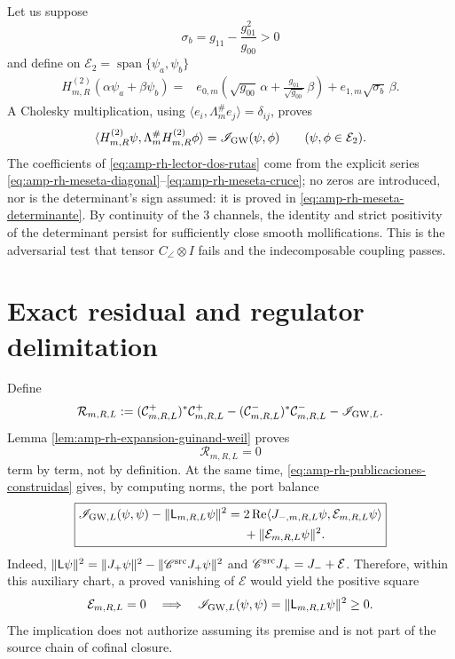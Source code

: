 Let us suppose
\[
 \sigma_b=g_{11}-\frac{g_{01}^2}{g_{00}}>0
\]
and define on \(\mathcal E_2=\operatorname{span}\{\psi_a,\psi_b\}\)
\begin{align}
 H^{(2)}_{m,R}(\alpha\psi_a+\beta\psi_b)
 ={}&
 e_{0,m}\left(
 \sqrt{g_{00}}\,\alpha
 +\frac{g_{01}}{\sqrt{g_{00}}}\,\beta\right)
 +e_{1,m}\sqrt{\sigma_b}\,\beta .
 \label{eq:amp-rh-lector-dos-rutas}
\end{align}
A Cholesky multiplication, using \(\langle e_i,\Lambda_m^\#e_j\rangle=\delta_{ij}\), proves
\begin{equation}\label{eq:amp-rh-meseta-energia-exacta}
 \langle H^{(2)}_{m,R}\psi,
         \Lambda_m^\#H^{(2)}_{m,R}\phi\rangle
 =\mathscr I_{\rm GW}(\psi,\phi)
 \qquad(\psi,\phi\in\mathcal E_2).
\end{equation}
The coefficients of \eqref{eq:amp-rh-lector-dos-rutas} come from the explicit series \eqref{eq:amp-rh-meseta-diagonal}--\eqref{eq:amp-rh-meseta-cruce}; no zeros are introduced, nor is the determinant's sign assumed: it is proved in \eqref{eq:amp-rh-meseta-determinante}. By continuity of the \(3\) channels, the identity and strict positivity of the determinant persist for sufficiently close smooth mollifications. This is the adversarial test that tensor \(C_\angle\otimes I\) fails and the indecomposable coupling passes.

\section*{Exact residual and regulator delimitation}

Define
\begin{equation}\label{eq:amp-rh-residual-finito}
 \mathcal R_{m,R,L}
 :=
 (\mathcal C^+_{m,R,L})^*\mathcal C^+_{m,R,L}
 -(\mathcal C^-_{m,R,L})^*\mathcal C^-_{m,R,L}
 -\mathscr I_{{\rm GW},L}.
\end{equation}
Lemma \ref{lem:amp-rh-expansion-guinand-weil} proves
\[
 \mathcal R_{m,R,L}=0
\]
term by term, not by definition. At the same time, \eqref{eq:amp-rh-publicaciones-construidas} gives, by computing norms, the port balance
\begin{equation}\label{eq:amp-rh-balance-residual-puerto}
 \boxed{
 \begin{aligned}
 \mathscr I_{{\rm GW},L}(\psi,\psi)
 -\|\mathsf L_{m,R,L}\psi\|^2
 ={}&2\operatorname{Re}
 \langle J_{-,m,R,L}\psi,\mathcal E_{m,R,L}\psi\rangle\\
 &+\|\mathcal E_{m,R,L}\psi\|^2 .
 \end{aligned}}
\end{equation}
Indeed, \(\|\mathsf L\psi\|^2
=\|J_+\psi\|^2-\|\mathscr C^{\rm src}J_+\psi\|^2\) and \(\mathscr C^{\rm src}J_+=J_-+\mathcal E\). Therefore, within this auxiliary chart, a proved vanishing of \(\mathcal E\) would yield the positive square
\begin{equation}\label{eq:amp-rh-cuadrado-regulado}
 \mathcal E_{m,R,L}=0
 \quad\Longrightarrow\quad
 \mathscr I_{{\rm GW},L}(\psi,\psi)
 =\|\mathsf L_{m,R,L}\psi\|^2\geq0.
\end{equation}
The implication does not authorize assuming its premise and is not part of the source chain of cofinal closure.

